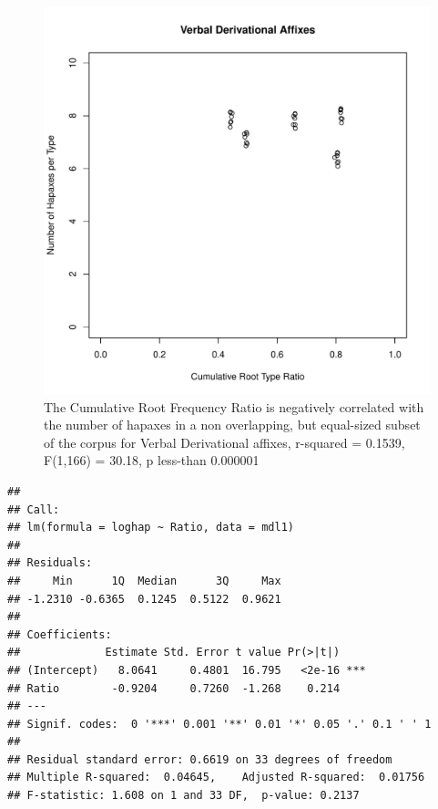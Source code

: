 \documentclass[12pt]{article}\usepackage[]{graphicx}\usepackage[]{color}
\makeatletter
\def\maxwidth{ %
  \ifdim\Gin@nat@width>\linewidth
    \linewidth
  \else
    \Gin@nat@width
  \fi
}
\newenvironment{kframe}{%
 \def\at@end@of@kframe{}%
 \ifinner\ifhmode%
  \def\at@end@of@kframe{\end{minipage}}%
  \begin{minipage}{\columnwidth}%
 \fi\fi%
 \def\FrameCommand##1{\hskip\@totalleftmargin \hskip-\fboxsep
 \colorbox{shadecolor}{##1}\hskip-\fboxsep
     \hskip-\linewidth \hskip-\@totalleftmargin \hskip\columnwidth}%
 \MakeFramed {\advance\hsize-\width
   \@totalleftmargin\z@ \linewidth\hsize
   \@setminipage}}%
 {\par\unskip\endMakeFramed%
 \at@end@of@kframe}
\newenvironment{knitrout}{}{} %
\makeatother
\begin{document}
\begin{knitrout}
\color{fgcolor}\begin{figure}
\includegraphics[width=\maxwidth]{figure/HapaxDataVerbalDerivation-1} \caption[The Cumulative Root Frequency Ratio is negatively correlated with the number of hapaxes in a non overlapping, but equal-sized subset of the corpus for Verbal Derivational affixes, r-squared = 0.1539, F(1,166) = 30.18, p less-than 0.000001]{The Cumulative Root Frequency Ratio is negatively correlated with the number of hapaxes in a non overlapping, but equal-sized subset of the corpus for Verbal Derivational affixes, r-squared = 0.1539, F(1,166) = 30.18, p less-than 0.000001}\label{fig:HapaxDataVerbalDerivation}
\end{figure}

\begin{kframe}\begin{verbatim}
## 
## Call:
## lm(formula = loghap ~ Ratio, data = mdl1)
## 
## Residuals:
##     Min      1Q  Median      3Q     Max 
## -1.2310 -0.6365  0.1245  0.5122  0.9621 
## 
## Coefficients:
##             Estimate Std. Error t value Pr(>|t|)    
## (Intercept)   8.0641     0.4801  16.795   <2e-16 ***
## Ratio        -0.9204     0.7260  -1.268    0.214    
## ---
## Signif. codes:  0 '***' 0.001 '**' 0.01 '*' 0.05 '.' 0.1 ' ' 1
## 
## Residual standard error: 0.6619 on 33 degrees of freedom
## Multiple R-squared:  0.04645,	Adjusted R-squared:  0.01756 
## F-statistic: 1.608 on 1 and 33 DF,  p-value: 0.2137
\end{verbatim}
\end{kframe}
\end{knitrout}
\end{document}
